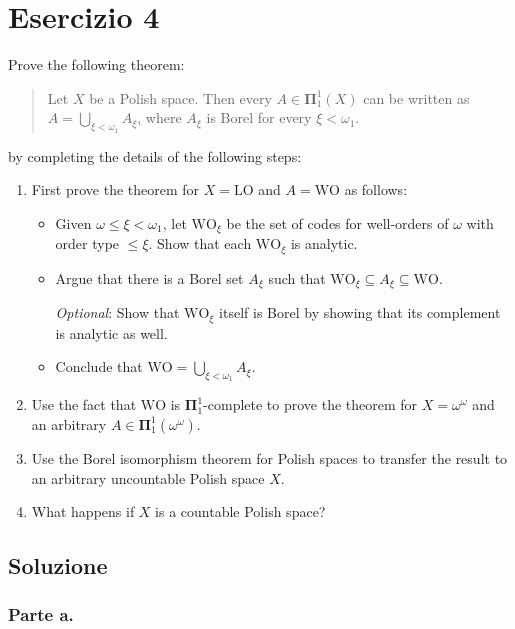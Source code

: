 \documentclass{article}
\newcommand{\1}{\mathds{1}}
\begin{document}
\section{Esercizio 4}
\label{sec:orga30ffb9}

Prove the following theorem:
\begin{quote}
Let \(X\) be a Polish space. Then every \(A \in \bm{\Pi}^1_1(X)\) can be written as \(A = \bigcup_{\xi < \omega_1} A_\xi\), where \(A_\xi\) is Borel for every \(\xi < \omega_1\).
\end{quote}
by completing the details of the following steps:

\begin{enumerate}
\item First prove the theorem for \(X = \mathrm{LO}\) and \(A = \mathrm{WO}\) as follows:
\begin{itemize}
\item Given \(\omega \leq \xi < \omega_1\), let \(\mathrm{WO}_\xi\) be the set of codes for well-orders of \(\omega\) with order type \(\leq \xi\). Show that each \(\mathrm{WO}_\xi\) is analytic.
\item Argue that there is a Borel set \(A_\xi\) such that \(\mathrm{WO}_\xi \subseteq A_\xi \subseteq \mathrm{WO}\).

\emph{Optional}: Show that \(\mathrm{WO}_\xi\) itself is Borel by showing that its complement is analytic as well.
\item Conclude that \(\mathrm{WO} = \bigcup_{\xi < \omega_1} A_\xi\).
\end{itemize}

\item Use the fact that \(\mathrm{WO}\) is \(\bm{\Pi}^1_1\)-complete to prove the theorem for \(X = \omega^\omega\) and an arbitrary \(A \in \bm{\Pi}^1_1(\omega^\omega)\).

\item Use the Borel isomorphism theorem for Polish spaces to transfer the result to an arbitrary uncountable Polish space \(X\).

\item What happens if \(X\) is a countable Polish space?
\end{enumerate}
\subsection{Soluzione}
\label{sec:org30a8dac}

\subsubsection{Parte a.}
\label{sec:org6d3ff7c}
\end{document}
